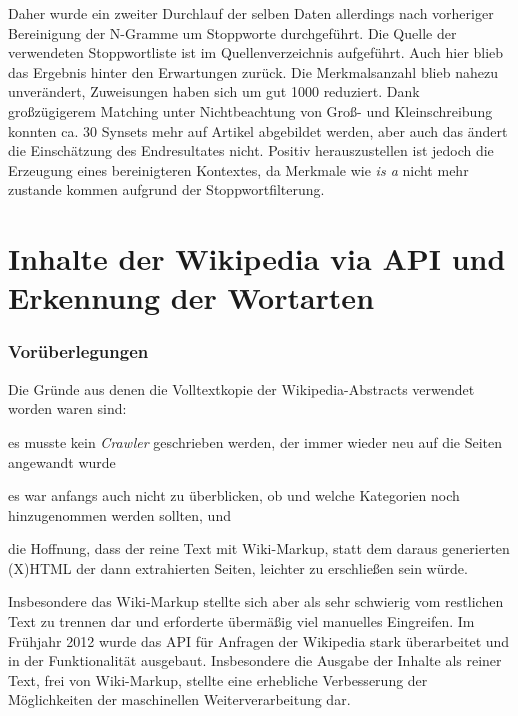 \documentclass[pagesize,paper=A4,DIV=calc,fontsize=12pt,draft=false]{scrreprt}
\begin{document}
Daher wurde ein zweiter Durchlauf der selben Daten allerdings nach vorheriger Bereinigung der N-Gramme um Stoppworte durchgeführt. 
Die Quelle der verwendeten Stoppwortliste ist im Quellenverzeichnis aufgeführt. 
Auch hier blieb das Ergebnis hinter den Erwartungen zurück. 
Die Merkmalsanzahl blieb nahezu unverändert, Zuweisungen haben sich um gut 1000 reduziert. 
Dank großzügigerem Matching unter Nichtbeachtung von Groß- und Kleinschreibung konnten ca. 30 Synsets mehr auf Artikel abgebildet werden, aber auch das ändert die Einschätzung des Endresultates nicht. 
Positiv herauszustellen ist jedoch die Erzeugung eines bereinigteren Kontextes, da Merkmale wie \emph{is a} nicht mehr zustande kommen aufgrund der Stoppwortfilterung. 

\section{Inhalte der Wikipedia via API und Erkennung der Wortarten}

\subsubsection{Vorüberlegungen}

Die Gründe aus denen die Volltextkopie der Wikipedia-Abstracts verwendet worden waren sind: 
\begin{inparaenum}
\item es musste kein \emph{Crawler} geschrieben werden, der immer wieder neu auf die Seiten angewandt wurde
\item es war anfangs auch nicht zu überblicken, ob und welche Kategorien noch hinzugenommen werden sollten, und 
\item die Hoffnung, dass der reine Text mit Wiki-Markup, statt dem daraus generierten (X)HTML der dann extrahierten Seiten, leichter zu erschließen sein würde.
\end{inparaenum}

Insbesondere das Wiki-Markup stellte sich aber als sehr schwierig vom restlichen Text zu trennen dar und erforderte übermäßig viel manuelles Eingreifen. 
Im Frühjahr 2012 wurde das API für Anfragen der Wikipedia stark überarbeitet und in der Funktionalität ausgebaut. 
Insbesondere die Ausgabe der Inhalte als reiner Text, frei von Wiki-Markup, stellte eine erhebliche Verbesserung der Möglichkeiten der maschinellen Weiterverarbeitung dar. 
\end{document}
